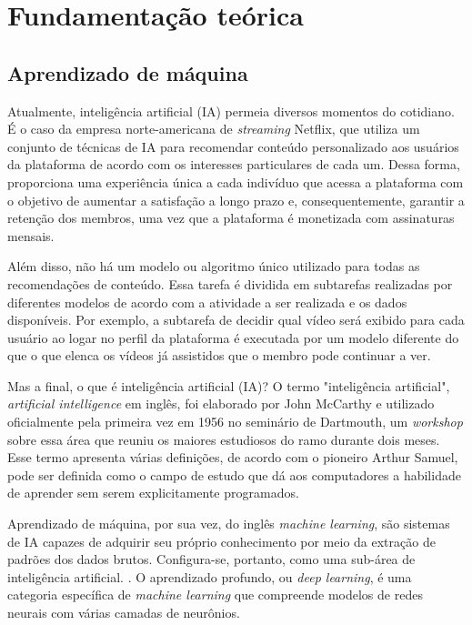 
\chapter{Fundamentação teórica}

\section{Aprendizado de máquina}

Atualmente, inteligência artificial (IA) permeia diversos 
momentos do cotidiano. É o caso da empresa norte-americana 
de \textit{streaming} Netflix, que utiliza um conjunto de 
técnicas de IA para recomendar conteúdo personalizado aos 
usuários da plataforma de acordo com os interesses 
particulares de cada um. Dessa forma, proporciona uma 
experiência única a cada indivíduo que acessa a plataforma 
com o objetivo de aumentar a satisfação a longo prazo e, 
consequentemente, garantir a retenção dos membros, uma vez 
que a plataforma é monetizada com assinaturas mensais. 

Além disso, não há um modelo ou algoritmo único utilizado 
para todas as recomendações de conteúdo. Essa tarefa é 
dividida em subtarefas realizadas por diferentes modelos de 
acordo com a atividade a ser realizada e os dados disponíveis. 
Por exemplo, a subtarefa de  decidir qual vídeo será exibido para 
cada usuário ao logar no perfil da plataforma é executada por um 
modelo diferente do que o que elenca os vídeos já assistidos que o 
membro pode continuar a ver. \cite{netflix}

Mas a final, o que é inteligência artificial (IA)? O termo 
"inteligência artificial", \textit{artificial intelligence} 
em inglês, foi elaborado por John McCarthy e utilizado 
oficialmente pela primeira vez em 1956 no seminário de 
Dartmouth, um \textit{workshop} sobre essa área que reuniu os 
maiores estudiosos do ramo durante dois meses. \cite{aima} 
Esse termo apresenta várias definições, de acordo com o 
pioneiro Arthur Samuel, pode ser definida como o campo de 
estudo que dá aos computadores a habilidade de aprender sem 
serem explicitamente programados. \cite{dl-oreilly} 

Aprendizado de máquina, por sua vez, do inglês 
\textit{machine learning}, são sistemas de IA capazes 
de adquirir seu próprio conhecimento por meio da extração 
de padrões dos dados brutos. Configura-se, portanto, como 
uma sub-área de inteligência artificial.
\cite{Goodfellow-et-al-2016}. O aprendizado profundo, ou 
\textit{deep learning}, é uma categoria específica de
 \textit{machine learning} que compreende modelos de redes 
 neurais com várias camadas de neurônios.\cite{d2l}

